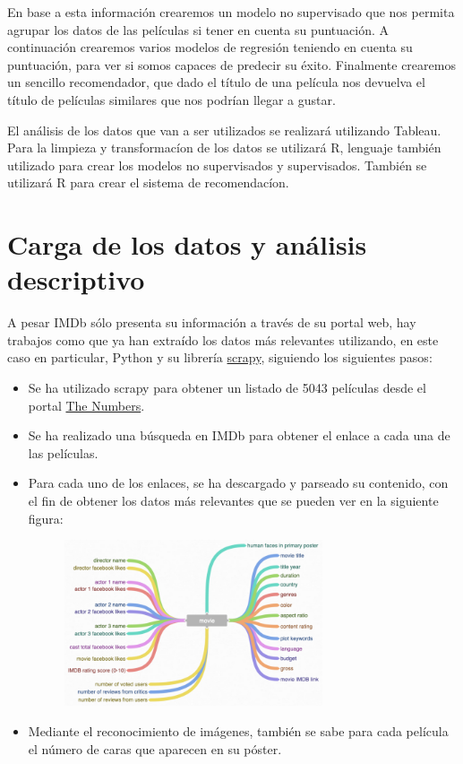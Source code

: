 \documentclass{article}
\begin{document}
En base a esta información crearemos un modelo no supervisado que nos permita agrupar los datos de las películas si tener en cuenta su puntuación. A continuación crearemos varios modelos de regresión teniendo en cuenta su puntuación, para ver si somos capaces de predecir su éxito. Finalmente crearemos un sencillo recomendador, que dado el título de una película nos devuelva el título de películas similares que nos podrían llegar a gustar.

El análisis de los datos que van a ser utilizados se realizará utilizando Tableau. Para la limpieza y transformacíon de los datos se utilizará R, lenguaje también utilizado para crear los modelos no supervisados y supervisados. También se utilizará R para crear el sistema de recomendacíon.  

\clearpage

\section{Carga de los datos y análisis descriptivo}

A pesar IMDb sólo presenta su información a través de su portal web, hay trabajos como \cite{imdb5000} que ya han extraído los datos más relevantes utilizando, en este caso en particular, Python y su librería \href{https://scrapy.org/}{scrapy}, siguiendo los siguientes pasos:

\begin{itemize}
  \item Se ha utilizado scrapy para obtener un listado de 5043 películas desde el portal \href{http://www.the-numbers.com/movie/budgets/all}{The Numbers}.
  \item Se ha realizado una búsqueda en IMDb para obtener el enlace a cada una de las películas.
  \item Para cada uno de los enlaces, se ha descargado y parseado su contenido, con el fin de obtener los datos más relevantes que se pueden ver en la siguiente figura:

    \begin{figure}[h]
    \centering
    \includegraphics[width=3in,clip,keepaspectratio]{./images/imdb_attributes}
    \label{fig:imdb_attributes}
    \end{figure}

  \item Mediante el reconocimiento de imágenes, también se sabe para cada película el número de caras que aparecen en su póster.
\end{itemize}
\end{document}
